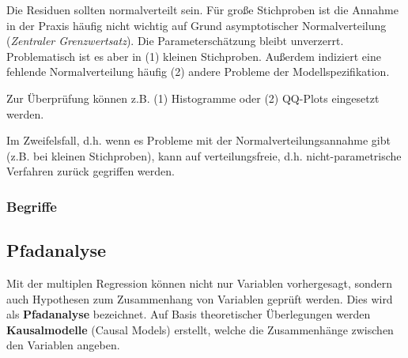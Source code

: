 \documentclass{article}
\numberwithin{equation}{section}
\begin{document}
Die Residuen sollten normalverteilt sein. Für große Stichproben ist die Annahme in der Praxis häufig nicht wichtig auf Grund asymptotischer Normalverteilung (\emph{Zentraler Grenzwertsatz}). Die Parameterschätzung bleibt unverzerrt. Problematisch ist es aber in (1) kleinen Stichproben. Außerdem indiziert eine fehlende Normalverteilung häufig (2) andere Probleme der Modellspezifikation.

Zur Überprüfung können z.B. (1) Histogramme oder (2) QQ-Plots eingesetzt werden.

Im Zweifelsfall, d.h. wenn es Probleme mit der Normalverteilungsannahme gibt (z.B. bei kleinen Stichproben), kann auf verteilungsfreie, d.h. nicht-parametrische Verfahren zurück gegriffen werden.

\subsubsection*{Begriffe}



\subsection{Pfadanalyse}
\label{sec:pfadana}

Mit der multiplen Regression können nicht nur Variablen vorhergesagt, sondern auch Hypothesen zum Zusammenhang von Variablen geprüft werden. Dies wird als \textbf{Pfadanalyse} bezeichnet. Auf Basis theoretischer Überlegungen werden \textbf{Kausalmodelle} (Causal Models) erstellt, welche die Zusammenhänge zwischen den Variablen angeben.
\end{document}

